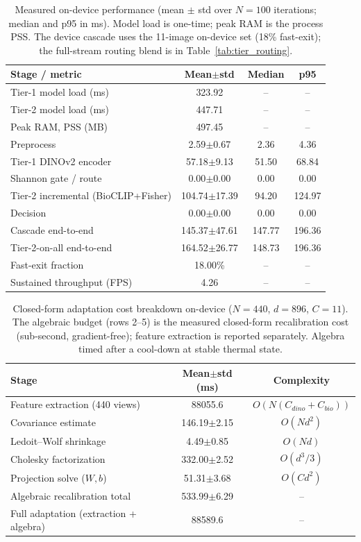 \documentclass[preprint,12pt]{elsarticle}
\begin{document}
\begin{table}[htbp]
\centering
\caption{Measured on-device performance (mean $\pm$ std over $N=100$ iterations; median and p95 in ms). Model load is one-time; peak RAM is the process PSS. The device cascade uses the 11-image on-device set (18\% fast-exit); the full-stream routing blend is in Table~\ref{tab:tier_routing}.}
\label{tab:device_perf}
\small
\begin{tabular}{lccc}
\toprule
Stage / metric & Mean$\pm$std & Median & p95 \\
\midrule
Tier-1 model load (ms) & 323.92 & -- & -- \\
Tier-2 model load (ms) & 447.71 & -- & -- \\
Peak RAM, PSS (MB) & 497.45 & -- & -- \\
\midrule
Preprocess & 2.59$\pm$0.67 & 2.36 & 4.36 \\
Tier-1 DINOv2 encoder & 57.18$\pm$9.13 & 51.50 & 68.84 \\
Shannon gate / route & 0.00$\pm$0.00 & 0.00 & 0.00 \\
Tier-2 incremental (BioCLIP+Fisher) & 104.74$\pm$17.39 & 94.20 & 124.97 \\
Decision & 0.00$\pm$0.00 & 0.00 & 0.00 \\
Cascade end-to-end & 145.37$\pm$47.61 & 147.77 & 196.36 \\
Tier-2-on-all end-to-end & 164.52$\pm$26.77 & 148.73 & 196.36 \\
\midrule
Fast-exit fraction & 18.00\% & -- & -- \\
Sustained throughput (FPS) & 4.26 & -- & -- \\
\bottomrule
\end{tabular}
\end{table}

\begin{table}[htbp]
\centering
\caption{Closed-form adaptation cost breakdown on-device ($N=440$, $d=896$, $C=11$). The algebraic budget (rows 2--5) is the measured closed-form recalibration cost (sub-second, gradient-free); feature extraction is reported separately. Algebra timed after a cool-down at stable thermal state.}
\label{tab:adaptation_breakdown}
\small
\begin{tabular}{lcc}
\toprule
Stage & Mean$\pm$std (ms) & Complexity \\
\midrule
Feature extraction (440 views) & 88055.6 & $O(N(C_{dino}+C_{bio}))$ \\
Covariance estimate & 146.19$\pm$2.15 & $O(Nd^2)$ \\
Ledoit--Wolf shrinkage & 4.49$\pm$0.85 & $O(Nd)$ \\
Cholesky factorization & 332.00$\pm$2.52 & $O(d^3/3)$ \\
Projection solve ($W,b$) & 51.31$\pm$3.68 & $O(Cd^2)$ \\
\midrule
Algebraic recalibration total & 533.99$\pm$6.29 & -- \\
Full adaptation (extraction + algebra) & 88589.6 & -- \\
\bottomrule
\end{tabular}
\end{table}
\end{document}
